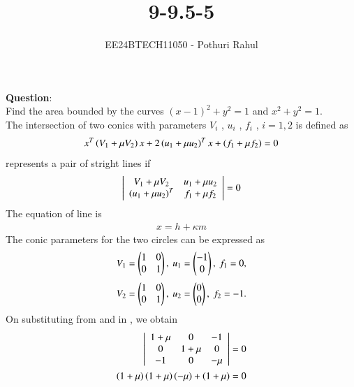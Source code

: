 \documentclass[journal]{IEEEtran}
\begin{document}

\vspace{3cm}

\title{9-9.5-5}
\author{EE24BTECH11050 - Pothuri Rahul}
{\let\newpage\relax\maketitle}

\renewcommand{\thefigure}{\theenumi}
\renewcommand{\thetable}{\theenumi}
\setlength{\intextsep}{10pt} %


\renewcommand{\thetable}{\theenumi}
\textbf{Question}:\\
Find the area bounded by the curves $(x-1)^2 + y^2 = 1$ and $x^2 + y^2 = 1$.  \\
\solution 
The intersection of two conics with parameters $V_i$ , $u_i$ , $f_i$ , $i = 1, 2$ is defined as
\begin{align}
      x^T\left(V_1+\mu V_2\right)x+2\left(u_1+\mu u_2\right)^Tx+\left(f_1+\mu f_2\right)=0
\end{align}
 represents a pair of stright lines if 
\begin{align}
\left| \begin{array}{cc}
V_1+\mu V_2 & u_1+\mu u_2 \\
\left(u_1+\mu u_2\right)^T & f_1+\mu f_2
\end{array} \right| =0
\end{align}
The equation of line is
\begin{align}
x=h+\kappa m
\end{align}
The conic parameters for the two circles can be expressed as
 \begin{align}
V_1 = \begin{pmatrix}1 & 0 \\ 0 & 1\end{pmatrix}, \ u_1 = \begin{pmatrix} -1 \\ 0\end{pmatrix}, \ f_1 = 0, 
 \end{align}
 \begin{align}
V_2 = \begin{pmatrix}1 & 0 \\ 0 & 1\end{pmatrix}, \ u_2 = \begin{pmatrix}0 \\ 0\end{pmatrix}, \ f_2 = -1.
 \end{align}
On substituting from  and  in , we obtain
\begin{align}
\left| \begin{array}{ccc}
1 + \mu & 0 & -1 \\ 0 & 1 + \mu & 0 \\ -1 & 0 & -\mu 
\end{array} \right| = 0 
\\
 \left(1+\mu\right) \left(1+\mu\right) \left(-\mu\right)+\left(1+\mu\right) =0
  \end{align}
\end{document}
